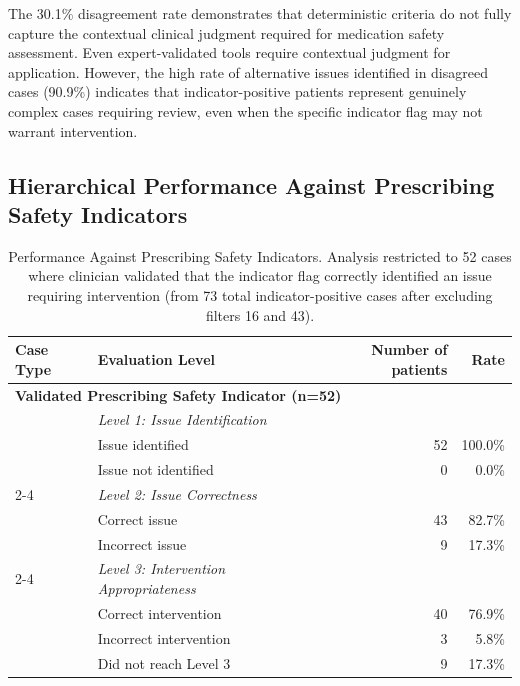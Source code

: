     The 30.1\% disagreement rate demonstrates that deterministic criteria do not fully capture the contextual clinical judgment required for medication safety assessment. Even expert-validated tools require contextual judgment for application. However, the high rate of alternative issues identified in disagreed cases (90.9\%) indicates that indicator-positive patients represent genuinely complex cases requiring review, even when the specific indicator flag may not warrant intervention.

\subsection{Hierarchical Performance Against Prescribing Safety Indicators}

    \begin{table}[htbp]
        \centering

        \begin{tabular}{@{}llrr@{}}
        \toprule
        \textbf{Case Type} & \textbf{Evaluation Level} & \textbf{Number of patients} & \textbf{Rate} \\
        \midrule
        \multicolumn{4}{l}{\textbf{Validated Prescribing Safety Indicator (n=52)}} \\
        \midrule
        & \textit{Level 1: Issue Identification} & & \\
        & \quad Issue identified & 52 & 100.0\% \\
        & \quad Issue not identified & 0 & 0.0\% \\
        \cmidrule(lr){2-4}
        & \textit{Level 2: Issue Correctness} & & \\
        & \quad Correct issue & 43 & 82.7\% \\
        & \quad Incorrect issue & 9 & 17.3\% \\
        \cmidrule(lr){2-4}
        & \textit{Level 3: Intervention Appropriateness} & & \\
        & \quad Correct intervention & 40 & 76.9\% \\
        & \quad Incorrect intervention & 3 & 5.8\% \\
        & \quad Did not reach Level 3 & 9 & 17.3\% \\
        \bottomrule
        \end{tabular}
        \caption{Performance Against Prescribing Safety Indicators. Analysis restricted to 52 cases where clinician validated that the indicator flag correctly identified an issue requiring intervention (from 73 total indicator-positive cases after excluding filters 16 and 43).}
        \label{tab:pincer_performance}
    \end{table}

